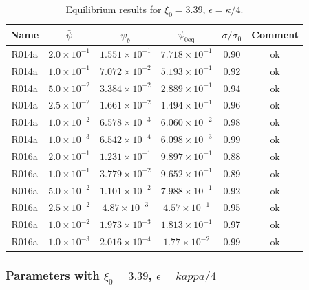 \begin{table}
\begin{center}
\begin{tabular}{|c|c|c|c|c|c|}
\hline
Name & $\bar{\psi}$ & $\psi_b$ & $\psi_{0\mathrm{eq}}$
     & $\sigma / \sigma_0$  & Comment \\
\hline
R014a &  $2.0\times 10^{-1}$ & $1.551\times 10^{-1}$ & $7.718\times10^{-1}$
      & 0.90 & ok\\
R014a &  $1.0\times 10^{-1}$ & $7.072\times 10^{-2}$ & $5.193\times10^{-1}$
      & 0.92 & ok\\
R014a &  $5.0\times 10^{-2}$ & $3.384\times 10^{-2}$ & $2.889\times10^{-1}$
      & 0.94 & ok\\
R014a &  $2.5\times 10^{-2}$ & $1.661\times 10^{-2}$ & $1.494\times10^{-1}$
      & 0.96 & ok\\
R014a &  $1.0\times 10^{-2}$ & $6.578\times 10^{-3}$ & $6.060\times10^{-2}$
      & 0.98 & ok\\
R014a &  $1.0\times 10^{-3}$ & $6.542\times 10^{-4}$ & $6.098\times10^{-3}$
      & 0.99 & ok\\
\hline
R016a &  $2.0\times 10^{-1}$ & $1.231\times 10^{-1}$ & $9.897\times10^{-1}$
      & 0.88 & ok\\
R016a &  $1.0\times 10^{-1}$ & $3.779\times 10^{-2}$ & $9.652\times10^{-1}$
      & 0.89 & ok\\
R016a &  $5.0\times 10^{-2}$ & $1.101\times 10^{-2}$ & $7.988\times10^{-1}$
      & 0.92 & ok\\
R016a &  $2.5\times 10^{-2}$ & $4.87\times 10^{-3}$ & $4.57\times10^{-1}$
      & 0.95 & ok\\
R016a &  $1.0\times 10^{-2}$ & $1.973\times 10^{-3}$ & $1.813\times10^{-1}$
      & 0.97 & ok\\
R016a &  $1.0\times 10^{-3}$ & $2.016\times 10^{-4}$ & $1.77\times10^{-2}$
      & 0.99 & ok\\
\hline
\end{tabular}
\label{table:xi226}
\caption{Equilibrium results for $\xi_0 = 3.39$, $\epsilon = \kappa/4$.}
\end{center}
\end{table}

\subsubsection{Parameters with $\xi_0 = 3.39$, $\epsilon = kappa/4$}

